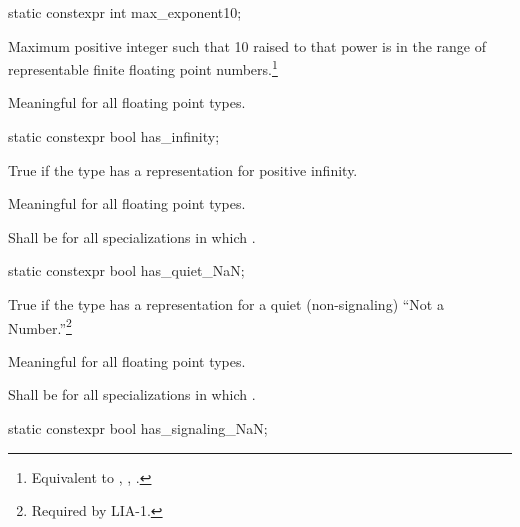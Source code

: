 \begin{itemdecl}
static constexpr int  max_exponent10;
\end{itemdecl}

\begin{itemdescr}
\pnum
Maximum positive integer such that 10 raised to that power is in the
range of representable finite floating point numbers.\footnote{Equivalent to
, , .}

\pnum
Meaningful for all floating point types.
\end{itemdescr}

\begin{itemdecl}
static constexpr bool has_infinity;
\end{itemdecl}

\begin{itemdescr}
\pnum
True if the type has a representation for positive infinity.

\pnum
Meaningful for all floating point types.

\pnum
Shall be
for all specializations in which
.
\end{itemdescr}

\begin{itemdecl}
static constexpr bool has_quiet_NaN;
\end{itemdecl}

\begin{itemdescr}
\pnum
True if the type has a representation for a quiet (non-signaling) ``Not a
Number.''\footnote{Required by LIA-1.}

\pnum
Meaningful for all floating point types.

\pnum
Shall be
for all specializations in which
.
\end{itemdescr}

\begin{itemdecl}
static constexpr bool has_signaling_NaN;
\end{itemdecl}

